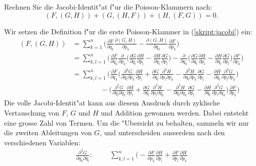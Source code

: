 Rechnen Sie die Jacobi-Identit"at f"ur die Poisson-Klammern nach:
\begin{equation}
(F,(G,H))+ (G,(H,F))+ (H,(F,G))=0.
\label{skript:jacobi}
\end{equation}

\begin{loesung}
Wir setzen die Definition f"ur die erste Poisson-Klammer in
(\ref{skript:jacobi}) ein:
\begin{align*}
(F,(G,H))
&=
\sum_{k=1}^n\biggl(
\frac{\partial F}{\partial q_k} \frac{\partial (G,H)}{\partial p_k}
-
\frac{\partial (G,H)}{\partial q_k} \frac{\partial F}{\partial p_k}
\biggr)
\\
&=
\sum_{k,l=1}^n\biggl(
\frac{\partial F}{\partial q_k}
\frac{\partial}{\partial p_k}\biggl(
\frac{\partial G}{\partial q_l}\frac{\partial H}{\partial p_l}
-
\frac{\partial H}{\partial q_l}\frac{\partial G}{\partial p_l}
\biggr)
-
\frac{\partial}{\partial q_k}\biggl(
\frac{\partial G}{\partial q_l}\frac{\partial H}{\partial p_l}
-
\frac{\partial H}{\partial q_l}\frac{\partial G}{\partial p_l}
\biggr)
\frac{\partial F}{\partial p_k}
\biggr)
\\
&=
\sum_{k,l=1}^n\biggl(
\frac{\partial F}{\partial q_k}
\biggl(
\frac{\partial^2 G}{\partial q_l\partial p_k}\frac{\partial H}{\partial p_l}
+
\frac{\partial G}{\partial q_l}\frac{\partial^2 H}{\partial p_l\partial p_k}
-
\frac{\partial^2 H}{\partial q_l\partial p_k}\frac{\partial G}{\partial p_l}
-
\frac{\partial H}{\partial q_l}\frac{\partial^2 G}{\partial p_l\partial p_k}
\biggr)
\\
&\qquad\qquad
-
\biggl(
\frac{\partial^2 G}{\partial q_l\partial q_k}\frac{\partial H}{\partial p_l}
+
\frac{\partial G}{\partial q_l}\frac{\partial^2 H}{\partial p_l\partial q_k}
-
\frac{\partial^2 H}{\partial q_l\partial q_k}\frac{\partial G}{\partial p_l}
-
\frac{\partial H}{\partial q_l}\frac{\partial^2 G}{\partial p_l\partial q_k}
\biggr)
\frac{\partial F}{\partial p_k}
\biggr)
\end{align*}
Die volle Jacobi-Identit"at kann aus diesem Ausdruck durch zyklische
Vertauschung von $F$, $G$ und $H$ und Addition gewonnen werden.
Dabei entsteht eine grosse Zahl von Termen.
Um die "Ubersicht zu behalten, sammeln wir nur die zweiten Ableitungen
von $G$,
und unterscheiden ausserdem nach den verschiedenen Variablen:
\begin{align*}
\frac{\partial^2 G}{\partial q_k\partial q_l}:&
&&
\sum_{k,l=1}^n
\biggl(
-\frac{\partial F}{\partial p_k} \frac{\partial H}{\partial p_l}
+\frac{\partial F}{\partial p_l} \frac{\partial H}{\partial p_k}

\end{align*}
\end{loesung}
